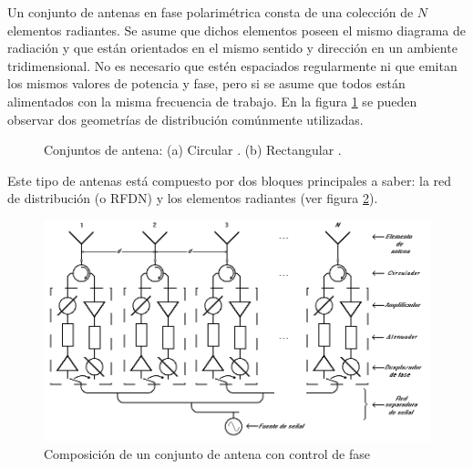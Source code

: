 Un conjunto de antenas en fase polarimétrica consta de una colección de $N$ elementos radiantes. Se asume que dichos elementos
poseen el mismo diagrama de radiación y que están orientados en el mismo sentido y dirección en un ambiente tridimensional. No es
necesario que estén espaciados regularmente ni que emitan los mismos valores de potencia y fase, pero si se asume
que todos están alimentados con la misma frecuencia de trabajo. En la figura \ref{fig:phasedArrayAntenna} se pueden observar
dos geometrías de distribución comúnmente utilizadas.

\begin{figure}[H]
	\centering
		\caption{Conjuntos de antena: (a) Circular \cite{Bapna1996}. (b) Rectangular \cite{Aumann1989}.}
	\label{fig:phasedArrayAntenna}
\end{figure}

Este tipo de antenas está compuesto por dos bloques principales a saber: la red de distribución (o RFDN) y los elementos 
radiantes (ver figura \ref{fig:compositionAntenna}).

\begin{figure}[H]
 \centering
 \includegraphics[width=12cm]{gfx/CompositionAntenna.png}
 \caption{Composición de un conjunto de antena con control de fase}
 \label{fig:compositionAntenna}
\end{figure}


